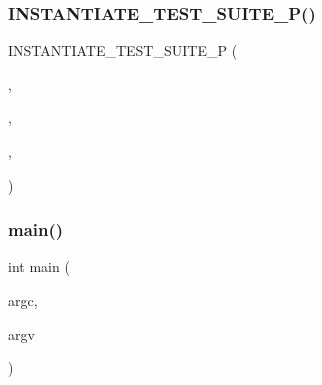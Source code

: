 \mbox{\label{googletest-master_2googletest_2test_2googletest-output-test___8cc_a5c488fe4474fec68c24acfc4fb353ed7}} 
\subsubsection{\texorpdfstring{INSTANTIATE\_TEST\_SUITE\_P()}{INSTANTIATE\_TEST\_SUITE\_P()}\hspace{0.1cm}{\footnotesize\ttfamily [2/2]}}
{\footnotesize\ttfamily I\+N\+S\+T\+A\+N\+T\+I\+A\+T\+E\+\_\+\+T\+E\+S\+T\+\_\+\+S\+U\+I\+T\+E\+\_\+P (\begin{DoxyParamCaption}\item[{Printing\+Strings}]{,  }\item[{\mbox{\hyperlink{class_param_test}{Param\+Test}}}]{,  }\item[{\mbox{\hyperlink{namespacetesting_abd3c87b40c2a0663691c9b617ed5fcc2}{testing\+::\+Values}}(std\+::string(\char`\"{}a\char`\"{}))}]{,  }\item[{\mbox{\hyperlink{_obj__test_2lib_2googletest-release-1_88_81_2googletest_2test_2googletest-output-test___8cc_a61c686cb1c0f8f19c100ff975482ec7a}{Param\+Name\+Func}}}]{ }\end{DoxyParamCaption})}

\mbox{\label{googletest-master_2googletest_2test_2googletest-output-test___8cc_a3c04138a5bfe5d72780bb7e82a18e627}} 
\subsubsection{\texorpdfstring{main()}{main()}}
{\footnotesize\ttfamily int main (\begin{DoxyParamCaption}\item[{int}]{argc,  }\item[{char $\ast$$\ast$}]{argv }\end{DoxyParamCaption})}

